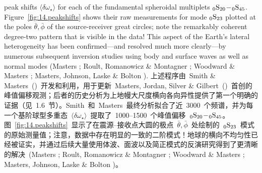 peak shifts $\langle\delta\omega_{\star}\rangle$ for
each of the fundamental spheroidal multiplets
${}_0{\rm S}_{20}\!-\!{}_0{\rm S}_{45}$.
Figure~\ref{fig:14.peakshifts} shows their raw measurements
for mode ${}_0{\rm S}_{23}$
plotted at the poles $\bar{\theta},\bar{\phi}$
of the source-receiver great circles; note the remarkably
coherent degree-two pattern that is visible in the data!
This aspect of the Earth's lateral heterogeneity has been
confirmed---and resolved much more clearly---by numerous
subsequent inversion studies using body and surface waves
as well as normal modes (Masters \citeyear{masters89};
Roult, Romanowicz \& Montagner \citeyear{roult&al90};
Woodward \& Masters \citeyear{woodward&masters91};
Masters, Johnson, Laske \& Bolton \citeyear{masters&al96}).
\fi
上述程序由~Smith \& Masters~(\citeyear{smith&masters89})~开发和利用，用于更新~Masters, Jordan, Silver \& Gilbert~(\citeyear{masters&al82})~首创的峰值偏移观测；后者的历史分析为上地幔大尺度横向各向异性提供了第一个明确的证据（见~1.6~节）。Smith~和~Masters~最终分析拟合了近~3000~个频谱，并为每一个基阶球型多重态~$\langle\delta\omega_{\star}\rangle$~提取了~1000\hspace{0.6 mm}--\hspace{0.2 mm}1500~个峰值偏移~${}_0{\rm S}_{20}\!-\!{}_0{\rm S}_{45}$。图~\ref{fig:14.peakshifts}~显示了在震源--接收点大圆的极点~$\bar{\theta},\bar{\phi}$~处绘制的~${}_0{\rm S}_{23}$~模式的原始测量值；注意，数据中存在明显的一致的二阶模式！地球的横向不均匀性已经被证实，并通过后续大量使用体波、面波以及简正模式的反演研究得到了更清晰的解决~(Masters \citeyear{masters89};
Roult, Romanowicz \& Montagner \citeyear{roult&al90};
Woodward \& Masters \citeyear{woodward&masters91};
Masters, Johnson, Laske \& Bolton \citeyear{masters&al96})。

